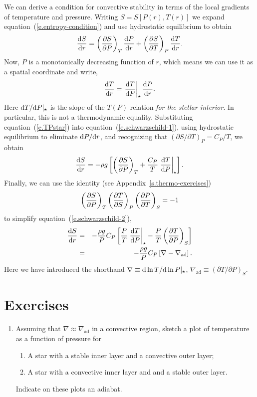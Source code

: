 We can derive a condition for convective stability in terms of the local gradients of temperature and pressure. Writing $S = S[P(r),T(r)]$ we expand equation~(\ref{e.entropy-condition}) and use hydrostatic equilibrium to obtain
\begin{equation}\label{e.schwarzschild-1}
\frac{\mathrm{d} S}{\mathrm{d} r} = \left(\frac{\partial S}{\partial P}\right)_{T} \frac{\mathrm{d} P}{\mathrm{d} r} + \left(\frac{\partial S}{\partial T}\right)_{P}\frac{\mathrm{d} T}{\mathrm{d} r} .
\end{equation}
Now, $P$ is a monotonically decreasing function of $r$, which means we can use it as a spatial coordinate and write,
\begin{equation}\label{e.TPstar}
\frac{\mathrm{d} T}{\mathrm{d} r} = \left.\frac{\mathrm{d} T}{\mathrm{d} P}\right|_{\star} \frac{\mathrm{d} P}{\mathrm{d} r} .
\end{equation}
Here $\mathrm{d} T/\mathrm{d} P|_{\star}$ is the slope of the $T(P)$ relation \emph{for the stellar interior}.  In particular, this is not a thermodynamic equality. Substituting equation~(\ref{e.TPstar}) into equation~(\ref{e.schwarzschild-1}), using hydrostatic equilibrium to eliminate $\mathrm{d} P/\mathrm{d} r$, and recognizing that $(\partial S/\partial T)_{P} = C_{P}/T$, we obtain
\begin{equation}\label{e.schwarzschild-2}
\frac{\mathrm{d} S}{\mathrm{d} r} =  -\rho g\left[\left(\frac{\partial S}{\partial P}\right)_{T} + \frac{C_{P}}{T} \left.\frac{\mathrm{d} T}{\mathrm{d} P}\right|_{\star} \right].
\end{equation}
Finally, we can use the identity (see Appendix~\ref{s.thermo-exercises})
\begin{equation}
\left(\frac{\partial S}{\partial P}\right)_{T}\left(\frac{\partial T}{\partial S}\right)_{P}\left(\frac{\partial P}{\partial T}\right)_{S} = -1
\end{equation}
to simplify equation~(\ref{e.schwarzschild-2}),
\begin{eqnarray}
\frac{\mathrm{d} S}{\mathrm{d} r} &=& -\frac{\rho g}{P}C_{P}\left[\frac{P}{T}\left.\frac{\mathrm{d} T}{\mathrm{d} P}\right|_{\star} - \frac{P}{T}\left(\frac{\partial T}{\partial P}\right)_{S}\right]\nonumber \\
 & = & -\frac{\rho g}{P}C_{P}\left[\nabla - \nabla_{\mathrm{ad}}\right].
 \label{e.schwarzschild}
\end{eqnarray}
Here we have introduced the shorthand $\nabla\equiv \mathrm{d} \ln T/\mathrm{d}\ln P|_{\star}$, $\nabla_{\mathrm{ad}} \equiv \left(\partial T/\partial P\right)_{S}$.
 
\section{Exercises}
\begin{enumerate}
\item Assuming that $\nabla \approx \nabla_{\mathrm{ad}}$ in a convective region, sketch a plot of temperature as a function of pressure for
\begin{enumerate}
\item A star with a stable inner layer and a convective outer layer;
\item A star with a convective inner layer and and a stable outer layer.
\end{enumerate}
Indicate on these plots an adiabat.
\end{enumerate}
